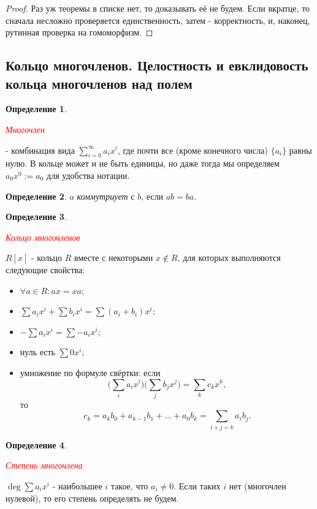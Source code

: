 \documentclass[a4paper,100pt]{article}
\theoremstyle{indented}
\theoremstyle{definition}
\newtheorem{defn}{Определение}
\theoremstyle{remark}
\begin{document}
\begin{proof}
    Раз уж теоремы в списке нет, то доказывать её не будем. Если вкратце, то сначала несложно проверяется единственность, затем - корректность, и, наконец, рутинная проверка на гомоморфизм.
\end{proof}

\resetall

\subsection{Кольцо многочленов. Целостность и евклидовость кольца многочленов над полем}

\begin{defn}
    \hypertarget{n27}{\textcolor{red}{\textit{Многочлен}}} - комбинация вида $\sum_{i=0}^\infty a_ix^i$, где почти все (кроме конечного числа) $\{a_i\}$ равны нулю. В кольце может и не быть единицы, но даже тогда мы определяем $a_0x^0:=a_0$ для удобства нотации.
\end{defn}

\begin{defn}
    $a$ \textit{коммутриует} с $b$, если $ab=ba$.
\end{defn}

\begin{defn}
    \hypertarget{n28}{\textcolor{red}{\textit{Кольцо многочленов}}} $R[x]$ - кольцо $R$ вместе с некоторыми $x\notin R$, для которых выполняются следующие свойства:\ 

    \begin{itemize}
        \item $\forall a\in R:ax=xa$;
        \item $\sum a_ix^i+\sum b_ix^i=\sum(a_i+b_i)x^i$;
        \item $-\sum a_ix^i=\sum-a_ix^i$;
        \item нуль есть $\sum 0x^i$;
        \item умножение по формуле свёртки: если 
        \[
            \biggl(\sum_i a_i x^i\biggr)\biggl(\sum_j b_j x^j\biggr)=\sum_k c_k x^k, 
        \]
        то
        \[
            c_k=a_kb_0+a_{k-1}b_1+\dots+a_0b_k=\sum_{i+j=k}a_ib_j.
        \]
    \end{itemize}
\end{defn}

\begin{defn}
    \hypertarget{n29}{\textcolor{red}{\textit{Степень многочлена}}} $\deg \sum a_i x^i$ - наибольшее $i$ такое, что $a_i\neq 0$. Если таких $i$ нет (многочлен нулевой), то его степень определять не будем.
\end{defn}
\end{document}
